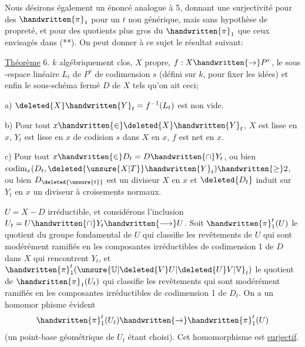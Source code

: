 Nous désirons également un énoncé analogue à 5, donnant une surjectivité pour des $\handwritten{\pi}_1$ pour un $t$ non générique, mais sans hypothèse de propreté, et pour des quotients plus gros du $\handwritten{\pi}_1$ que ceux envisagés dans (**). On peut donner à ce sujet le résultat suivant:

\uline{Théorème} 6.  $k$ algébriquement clos,  $X$ propre, $f:X\handwritten{\rightarrow}P^r$,  le sous -espace linéaire $L_t$ de $P^r$ de codimension $s$ (défini sur $k$, pour fixer les idées)  et enfin le sous-schéma fermé $D$ de $X$ tels qu'on ait ceci; 

a)  $\deleted{X}\handwritten{Y}_t=f^{-1}(L_t)$ est non vide.

b) Pour tout $x\handwritten{\in}\deleted{X}\handwritten{Y}_t$, $X$ est lisse en $x$, $Y_t$ est lisse en $x$\handwritten{,} de codision $s$ dans $X$ en $x$, $f$ est net en $x$.

c) Pour tout $x\handwritten{\in}D_t=D\handwritten{\cap}Y_t$, o\deleted{\`{}}u  bien $\operatorname{codim}_x(D_t,\deleted{\unsure{X|T}}\handwritten{Y}_t)\handwritten{\geq}2$, ou bien $D_{\deleted{\unsure{t}}}$ est un diviseur  $X$ en $x$ et $\deleted{D_t}$ induit sur $Y_t$ en $x$ un diviseur à croisements normaux.

 $U=X-D$ irréductible, et considérons l'inclusion $U_t=U\handwritten{\cap}Y_t\handwritten{\longrightarrow}U$.  Soit $\handwritten{\pi}_1^t(U)$ le  quotient du groupe fondamental de $U$  qui classifie les revêtements de $U$ qui sont modérément ramifiés en les composantes irréductibles de codimension 1 de $D$ dans $X$ qui rencontrent $Y_t$,  et $\handwritten{\pi}_1^t(\unsure{\mathbb{U}|\deleted{V}U|\deleted{U}V|\mathbb{V}}_t)$ le quotient  de $\handwritten{\pi}_1(U_t)$ qui classifie les revêtements qui sont modérément ramifiés en les composantes irréductibles de codimension 1 de $D_t$. On a un homomor%
%
phisme évident
\[
\handwritten{\pi}_1^t(U_t)\handwritten{\rightarrow}\handwritten{\pi}_1^t(U)
\]
(un point-base géométrique de $U_t$ étant choisi). Cet homomorphisme est \uline{surjectif}.

